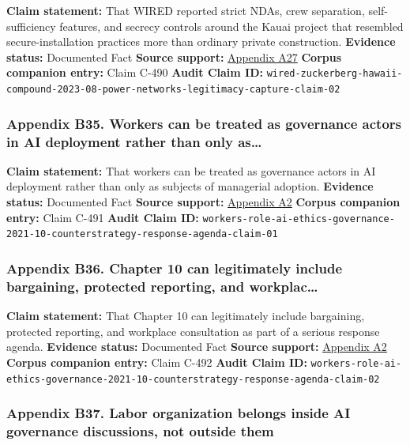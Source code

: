 \documentclass[
  american,
  11pt,
  letterpaper,
]{article}
\begin{document}
\textbf{Claim statement:} That WIRED reported strict NDAs, crew
separation, self-sufficiency features, and secrecy controls around the
Kauai project that resembled secure-installation practices more than
ordinary private construction. \textbf{Evidence status:} Documented Fact
\textbf{Source support:}
\hyperref[appendix-a27-inside-mark-zuckerbergs-top-secret-hawaii-compound]{Appendix
A27} \textbf{Corpus companion entry:} Claim C-490 \textbf{Audit Claim
ID:}
\texttt{wired-zuckerberg-hawaii-compound-2023-08-power-networks-legitimacy-capture-claim-02}

\subsubsection{Appendix B35. Workers can be treated as governance actors
in AI deployment rather than only
as\ldots{}}\label{appendix-b35-workers-can-be-treated-as-governance-actors-in-ai-deployment-rather-than-only-as}

\textbf{Claim statement:} That workers can be treated as governance
actors in AI deployment rather than only as subjects of managerial
adoption. \textbf{Evidence status:} Documented Fact \textbf{Source
support:}
\hyperref[appendix-a2-in-oxford-handbook-on-ai-governance-the-role-of-workers-in-ai-ethics-and-governance]{Appendix
A2} \textbf{Corpus companion entry:} Claim C-491 \textbf{Audit Claim
ID:}
\texttt{workers-role-ai-ethics-governance-2021-10-counterstrategy-response-agenda-claim-01}

\subsubsection{Appendix B36. Chapter 10 can legitimately include
bargaining, protected reporting, and
workplac\ldots{}}\label{appendix-b36-chapter-10-can-legitimately-include-bargaining-protected-reporting-and-workplac}

\textbf{Claim statement:} That Chapter 10 can legitimately include
bargaining, protected reporting, and workplace consultation as part of a
serious response agenda. \textbf{Evidence status:} Documented Fact
\textbf{Source support:}
\hyperref[appendix-a2-in-oxford-handbook-on-ai-governance-the-role-of-workers-in-ai-ethics-and-governance]{Appendix
A2} \textbf{Corpus companion entry:} Claim C-492 \textbf{Audit Claim
ID:}
\texttt{workers-role-ai-ethics-governance-2021-10-counterstrategy-response-agenda-claim-02}

\subsubsection{Appendix B37. Labor organization belongs inside AI
governance discussions, not outside
them}\label{appendix-b37-labor-organization-belongs-inside-ai-governance-discussions-not-outside-them}
\end{document}
